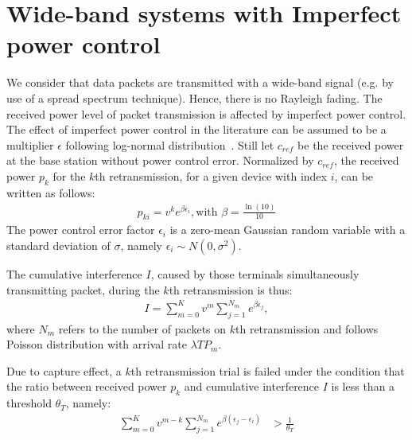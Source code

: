 \section{Wide-band systems with Imperfect power control}
\label{sec:imperfect-power-control}
 We consider that data packets are transmitted with a wide-band signal (e.g. by use of a spread spectrum technique). Hence, there is no Rayleigh fading. The received power level of packet transmission is affected by imperfect power control. The effect of imperfect power control in the literature can be assumed to be a multiplier $\epsilon$ following log-normal distribution~\cite{Lee:1992:MCD:530392}. Still let $c_{ref}$ be the received power at the base station without power control error. Normalized by $c_{ref}$, the received power $p_k$ for the $k$th retransmission, for a given device with index $i$, can be written as follows:
\begin{align*}
p_{ki} = v^k e^{\beta \epsilon_i}, \text{with } \beta = \frac{\ln(10)}{10}
\end{align*}
The power control error factor $\epsilon_i$ is a zero-mean Gaussian random variable with a standard deviation of $\sigma$, namely $\epsilon_i \sim N\left( 0, \sigma^2\right)$. 

The cumulative interference $I$, caused by those terminals simultaneously transmitting packet,  during the $k$th retransmission is thus:
\begin{align*}
I = \sum_{m=0}^{K} v^{m}\sum_{j=1}^{N_m} e^{\beta \epsilon_j},
\end{align*}
where $N_m$ refers to the number of packets on $k$th retransmission and follows Poisson distribution with arrival rate $\lambda T P_m$. 

Due to capture effect, a $k$th retransmission trial is failed under the condition that the ratio between received power $p_k$ and cumulative interference $I$ is less than a threshold $\theta_{T}$, namely:
\begin{align*}
\sum_{m=0}^{K} v^{m-k}\sum_{j=1}^{N_m} e^{\beta \left( \epsilon_j - \epsilon_i \right) } &> \frac{1}{\theta_{T}}
\end{align*}

